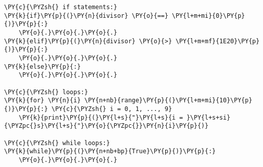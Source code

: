 \begin{Verbatim}[commandchars=\\\{\}]
\PY{c}{\PYZsh{} if statements:}
\PY{k}{if}\PY{p}{(}\PY{n}{divisor} \PY{o}{==} \PY{l+m+mi}{0}\PY{p}{)}\PY{p}{:}
    \PY{o}{.}\PY{o}{.}\PY{o}{.}
\PY{k}{elif}\PY{p}{(}\PY{n}{divisor} \PY{o}{>} \PY{l+m+mf}{1E20}\PY{p}{)}\PY{p}{:}
    \PY{o}{.}\PY{o}{.}\PY{o}{.}
\PY{k}{else}\PY{p}{:}
    \PY{o}{.}\PY{o}{.}\PY{o}{.}

\PY{c}{\PYZsh{} loops:}
\PY{k}{for} \PY{n}{i} \PY{n+nb}{range}\PY{p}{(}\PY{l+m+mi}{10}\PY{p}{)}\PY{p}{:} \PY{c}{\PYZsh{} i = 0, 1, ..., 9}
    \PY{k}{print}\PY{p}{(}\PY{l+s}{"}\PY{l+s}{i = }\PY{l+s+si}{\PYZpc{}s}\PY{l+s}{"}\PY{o}{\PYZpc{}}\PY{n}{i}\PY{p}{)}

\PY{c}{\PYZsh{} while loops:}
\PY{k}{while}\PY{p}{(}\PY{n+nb+bp}{True}\PY{p}{)}\PY{p}{:}
    \PY{o}{.}\PY{o}{.}\PY{o}{.}
\end{Verbatim}
